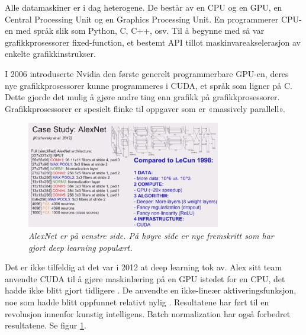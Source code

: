 Alle datamaskiner er i dag heterogene. De består av en CPU og en GPU, en Central Processing Unit og en Graphics Processing Unit. En programmerer CPU-en med språk slik som Python, C, C++, osv. Til å begynne med så var grafikkprosessorer fixed-function, et bestemt API tillot maskinvareakselerasjon av enkelte grafikkinstrukser. \cite{Buck 2006 s. 5}

I 2006 introduserte Nvidia den første generelt programmerbare GPU-en, deres nye grafikkprosessorer kunne programmeres i CUDA, et språk som ligner på C. Dette gjorde det mulig å gjøre andre ting enn grafikk på grafikkprosessorer. Grafikkprosessorer er spesielt flinke til oppgaver som er «massively parallell». \cite{Buck 2006 s. 1} %

\begin{figure}[t]
\begin{center} 
\includegraphics[scale=1.0]{figures/comparison}
\caption{\small \sl AlexNet er på venstre side. På høyre side er nye fremskritt som har gjort deep learning populært. \cite{Karpathy 2014} \label{fig:comparison}}
\end{center} 
\end{figure} 

Det er ikke tilfeldig at det var i 2012 at deep learning tok av. Alex sitt team anvendte CUDA til å gjøre maskinlæring på en GPU istedet for en CPU, det hadde ikke blitt gjort tidligere \cite{Krizhevsky m.fl. 2012}. De anvendte en ikke-lineær aktiveringsfunksjon, noe som hadde blitt oppfunnet relativt nylig \cite{LeCun m.fl. 1998 s. 3}. Resultatene har ført til en revolusjon innenfor kunstig intelligens. Batch normalization har også forbedret resultatene. Se figur \ref{fig:comparison}. \cite{Ioffe og Szegedy 2015 s. 1}

